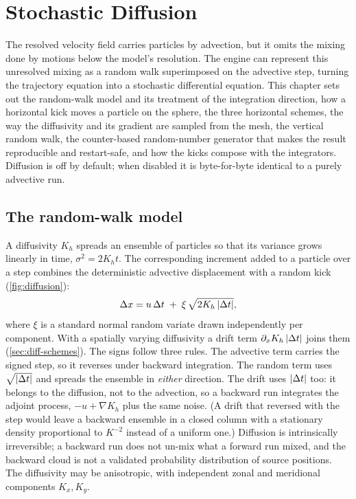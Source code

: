 \chapter{Stochastic Diffusion}\label{ch:diffusion}

The resolved velocity field carries particles by advection, but it omits the mixing done by motions below
the model's resolution. The engine can represent this unresolved mixing as a random walk superimposed on
the advective step, turning the trajectory equation into a stochastic differential equation. This chapter
sets out the random-walk model and its treatment of the integration direction, how a horizontal kick moves
a particle on the sphere, the three horizontal schemes, the way the diffusivity and its gradient are
sampled from the mesh, the vertical random walk, the counter-based random-number generator that makes the
result reproducible and restart-safe, and how the kicks compose with the integrators. Diffusion is off by
default; when disabled it is byte-for-byte identical to a purely advective run.

\section{The random-walk model}\label{sec:diff-model}

A diffusivity $K_h$ spreads an ensemble of particles so that its variance grows linearly in time,
$\sigma^2 = 2K_h t$. The corresponding increment added to a particle over a step combines the
deterministic advective displacement with a random kick (\cref{fig:diffusion}):
\begin{equation}\label{eq:diff-step}
  \Delta x = u\,\Delta t \;+\; \xi\,\sqrt{2K_h\,\lvert\Delta t\rvert},
\end{equation}
where $\xi$ is a standard normal random variate drawn independently per component. With a spatially varying
diffusivity a drift term $\partial_x K_h\,\lvert\Delta t\rvert$ joins them (\cref{sec:diff-schemes}). The signs
follow three rules. The advective term carries the signed step, so it reverses under backward integration.
The random term uses $\sqrt{\lvert\Delta t\rvert}$ and spreads the ensemble in \emph{either} direction. The
drift uses $\lvert\Delta t\rvert$ too: it belongs to the diffusion, not to the advection, so a backward run
integrates the adjoint process, $-u+\nabla K_h$ plus the same noise. (A drift that reversed with the step
would leave a backward ensemble in a closed column with a stationary density proportional to $K^{-2}$
instead of a uniform one.) Diffusion is intrinsically irreversible; a backward run does not un-mix what a
forward run mixed, and the backward cloud is not a validated probability distribution of source positions.
The diffusivity may be anisotropic, with independent zonal and meridional components $K_x,K_y$.

